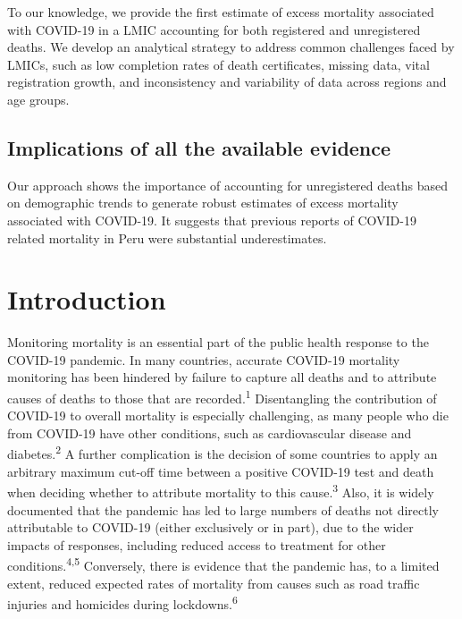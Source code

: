 \documentclass[
]{article}
\begin{document}
To our knowledge, we provide the first estimate of excess mortality associated with COVID-19 in a LMIC accounting for both registered and unregistered deaths. We develop an analytical strategy to address common challenges faced by LMICs, such as low completion rates of death certificates, missing data, vital registration growth, and inconsistency and variability of data across regions and age groups.

\hypertarget{implications-of-all-the-available-evidence}{%
\subsection*{Implications of all the available evidence}\label{implications-of-all-the-available-evidence}}

Our approach shows the importance of accounting for unregistered deaths based on demographic trends to generate robust estimates of excess mortality associated with COVID-19. It suggests that previous reports of COVID-19 related mortality in Peru were substantial underestimates.

\hypertarget{introduction}{%
\section{Introduction}\label{introduction}}

Monitoring mortality is an essential part of the public health response to the COVID-19 pandemic. In many countries, accurate COVID-19 mortality monitoring has been hindered by failure to capture all deaths and to attribute causes of deaths to those that are recorded.\textsuperscript{1} Disentangling the contribution of COVID-19 to overall mortality is especially challenging, as many people who die from COVID-19 have other conditions, such as cardiovascular disease and diabetes.\textsuperscript{2} A further complication is the decision of some countries to apply an arbitrary maximum cut-off time between a positive COVID-19 test and death when deciding whether to attribute mortality to this cause.\textsuperscript{3} Also, it is widely documented that the pandemic has led to large numbers of deaths not directly attributable to COVID-19 (either exclusively or in part), due to the wider impacts of responses, including reduced access to treatment for other conditions.\textsuperscript{4,5} Conversely, there is evidence that the pandemic has, to a limited extent, reduced expected rates of mortality from causes such as road traffic injuries and homicides during lockdowns.\textsuperscript{6}
\end{document}
